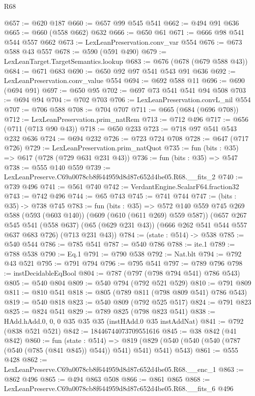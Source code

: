 \begin{lexlean}{R68}
\begin{coremodule}
@657 := @620 @187
@660 := @657 @99 @545 @541
@662 := @494 @91 @636
@665 := @660 (@558 @662) @632
@666 := @650 @61
@671 := @666 @98 @541 @544 @557 @662
@673 := LexLeanPreservation.conv_var @554
@676 := @673 @588 @43 @557
@678 := @590 (@591 @490)
@679 := LexLeanTarget.TargetSemantics.lookup
@683 := @676 (@678 (@679 @588 @43))
@684 := @671 @683
@690 := @650 @92 @97 @541 @543 @91 @636
@692 := LexLeanPreservation.conv_value @554
@694 := @692 @588 @11
@696 := @690 (@694 @91)
@697 := @650 @95
@702 := @697 @73 @541 @541 @94 @508
@703 := @694 @94
@704 := @702 @703
@706 := LexLeanPreservation.convL_nil @554
@707 := @706 @588
@708 := @704 @707
@711 := @665 (@684 (@696 @708))
@712 := LexLeanPreservation.prim_natRem
@713 := @712 @496
@717 := @656 (@711 (@713 @90 @43))
@718 := @650 @233
@723 := @718 @97 @541 @543 @232 @636
@724 := @694 @232
@726 := @723 @724 @708
@728 := @647 (@717 @726)
@729 := LexLeanPreservation.prim_natQuot
@735 := fun (bits : @35) => @617 (@728 (@729 @631 @231 @43))
@736 := fun (bits : @35) => @547
@738 := @555 @140 @559
@739 := LexLeanPreserve.C69a0078cb8f644959d8d87c652d4be05.R68.__fits_2
@740 := @739 @496
@741 := @561 @740
@742 := VerdantEngine.ScalarF64.fraction32
@743 := @742 @496
@744 := @65 @743
@745 := @741 @744
@747 := (bits : @35) -> @738 @745
@783 := fun (bits : @35) =>
  @572
    @140
    @559
    @745
    @269
    @588
    (@593 (@603 @140))
    (@609 (@610 (@611 @269) @559 @587))
    (@657
      @267
      @545
      @541
      (@558 @637)
      (@65 (@629 @231 @43))
      (@666 @262 @541 @544 @557 @637 @683 @726)
      (@713 @231 @43))
@784 := (state : @514) -> @538
@785 := @540 @544
@786 := @785 @541
@787 := @540 @786
@788 := ite.{1}
@789 := @788 @538
@790 := Eq.{1}
@791 := @790 @538
@792 := Nat.blt
@794 := @792 @43 @521
@795 := @791 @794
@796 := @795 @541
@797 := @789 @796
@798 := instDecidableEqBool
@804 := @787 (@797 (@798 @794 @541) @786 @543)
@805 := @540 @804
@809 := @540 @794 (@792 @521 @529)
@810 := @791 @809
@811 := @810 @541
@818 := @805 (@789 @811 (@798 @809 @541) @786 @543)
@819 := @540 @818
@823 := @540 @809 (@792 @525 @517)
@824 := @791 @823
@825 := @824 @541
@829 := @789 @825 (@798 @823 @541)
@838 := HAdd.hAdd.{0, 0, 0} @35 @35 @35 (instHAdd.{0} @35 instAddNat)
@841 := @792 (@838 @521 @521)
@842 := 18446744073709551616
@845 := @38 @842 (@41 @842)
@860 := fun (state : @514) =>
  @819 (@829 (@540 (@540 (@540 (@787 (@540 (@785 (@841 @845)) @544)) @541) @541) @541) @543)
@861 := @555 @428
@862 := LexLeanPreserve.C69a0078cb8f644959d8d87c652d4be05.R68.__enc_1
@863 := @862 @496
@865 := @494 @863 @508
@866 := @861 @865
@868 := LexLeanPreserve.C69a0078cb8f644959d8d87c652d4be05.R68.__fits_6 @496

\end{coremodule}
\end{lexlean}

